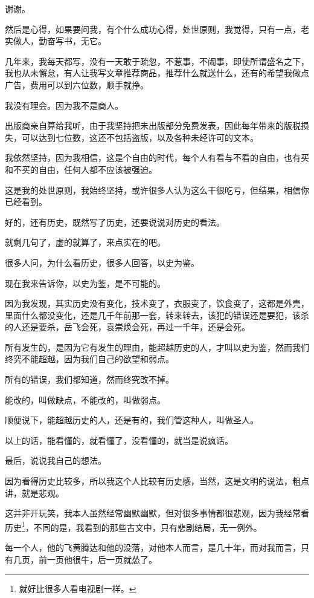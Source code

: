 \begin{multicols}{\theparacolNo}
		谢谢。

		然后是心得，如果要问我，有个什么成功心得，处世原则，我觉得，只有一点，老实做人，勤奋写书，无它。

		几年来，我每天都写，没有一天敢于疏忽，不惹事，不闹事，即使所谓盛名之下，我也从未懈怠，有人让我写文章推荐商品，推荐什么就送什么，还有的希望我做点广告，费用可以到六位数，顺手就挣。

		我没有理会。因为我不是商人。

		出版商亲自算给我听，由于我坚持把未出版部分免费发表，因此每年带来的版税损失，可以达到七位数，这还不包括盗版，以及各种未经许可的文本。

		我依然坚持，因为我相信，这是个自由的时代，每个人有看与不看的自由，也有买和不买的自由，任何人都不应该被强迫。

		这是我的处世原则，我始终坚持，或许很多人认为这么干很吃亏，但结果，相信你已经看到。

		好的，还有历史，既然写了历史，还要说说对历史的看法。

		就剩几句了，虚的就算了，来点实在的吧。

		很多人问，为什么看历史，很多人回答，以史为鉴。

		现在我来告诉你，以史为鉴，是不可能的。

		因为我发现，其实历史没有变化，技术变了，衣服变了，饮食变了，这都是外壳，里面什么都没变化，还是几千年前那一套，转来转去，该犯的错误还是要犯，该杀的人还是要杀，岳飞会死，袁崇焕会死，再过一千年，还是会死。

		所有发生的，是因为它有发生的理由，能超越历史的人，才叫以史为鉴，然而我们终究不能超越，因为我们自己的欲望和弱点。

		所有的错误，我们都知道，然而终究改不掉。

		能改的，叫做缺点，不能改的，叫做弱点。

		顺便说下，能超越历史的人，还是有的，我们管这种人，叫做圣人。

		以上的话，能看懂的，就看懂了，没看懂的，就当是说疯话。

		最后，说说我自己的想法。

		因为看得历史比较多，所以我这个人比较有历史感，当然，这是文明的说法，粗点讲，就是悲观。

		这并非开玩笑，我本人虽然经常幽默幽默，但对很多事情都很悲观，因为我经常看历史\footnote{就好比很多人看电视剧一样。}，不同的是，我看到的那些古文中，只有悲剧结局，无一例外。

		每一个人，他的飞黄腾达和他的没落，对他本人而言，是几十年，而对我而言，只有几页，前一页他很牛，后一页就怂了。


\end{multicols}
